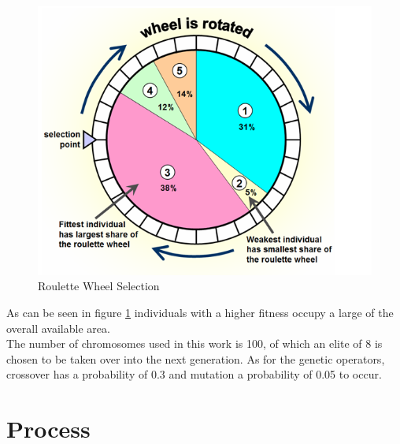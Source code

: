 \begin{figure}[h]
\begin{center}
\includegraphics[scale=0.4]{Chapter1/images/roulette_wheel.png} 
\caption[Roulette Wheel Selection]{Roulette Wheel Selection\footnotemark}
\label{fig:selection}
\end{center}
\end{figure} 


As can be seen in figure \ref{fig:selection} individuals with a higher fitness occupy a large of the overall available area. \\

The number of chromosomes used in this work is 100, of which an elite of 8 is chosen to be taken over into the next generation. 
As for the genetic operators, crossover has a probability of 0.3 and mutation a probability of 0.05 to occur.

\section{Process}



